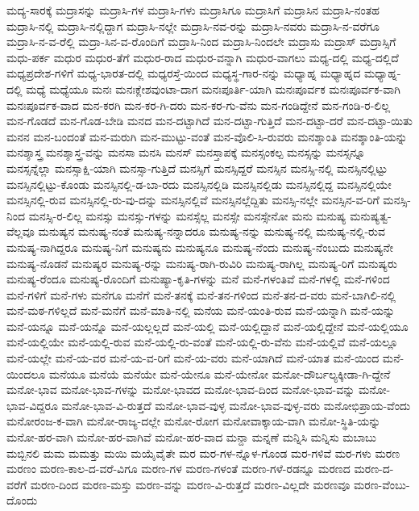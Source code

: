 {ಮದ್ಯ-ಸಾರಕ್ಕೆ
ಮದ್ರಾಸನ್ನು
ಮದ್ರಾಸಿ-ಗಳ
ಮದ್ರಾಸಿ-ಗಳು
ಮದ್ರಾಸಿಗೂ
ಮದ್ರಾಸಿಗೆ
ಮದ್ರಾಸಿನ
ಮದ್ರಾಸಿ-ನಂತಹ
ಮದ್ರಾಸಿ-ನಲ್ಲಿ
ಮದ್ರಾಸಿ-ನಲ್ಲಿದ್ದಾಗ
ಮದ್ರಾಸಿ-ನಲ್ಲೇ
ಮದ್ರಾಸಿ-ನವ-ರನ್ನು
ಮದ್ರಾಸಿ-ನವರು
ಮದ್ರಾಸಿ-ನ-ವರೆಗೂ
ಮದ್ರಾಸಿ-ನ-ವ-ರೆಲ್ಲಿ
ಮದ್ರಾ-ಸಿನ-ವ-ರೊಂದಿಗೆ
ಮದ್ರಾಸಿ-ನಿಂದ
ಮದ್ರಾಸಿ-ನಿಂದಲೇ
ಮದ್ರಾಸು
ಮದ್ರಾಸ್
ಮದ್ರಾಸ್ಸಿಗೆ
ಮಧು-ಪರ್ಕ
ಮಧುರ
ಮಧುರ-ತೆಗೆ
ಮಧುರ-ರಾದ
ಮಧುರ-ವನ್ನಾಗಿ
ಮಧುರ-ವಾಗಲು
ಮಧ್ಯ-ದಲ್ಲಿ
ಮಧ್ಯ-ದಲ್ಲಿದೆ
ಮಧ್ಯಪ್ರದೇಶ-ಗಳಿಗೆ
ಮಧ್ಯ-ಭಾರತ-ದಲ್ಲಿ
ಮಧ್ಯರಸ್ತೆ-ಯಿಂದ
ಮಧ್ಯಸ್ಥ-ಗಾರ-ನನ್ನು
ಮಧ್ಯಾಹ್ನ
ಮಧ್ಯಾಹ್ನದ
ಮಧ್ಯಾಹ್ನ-ದಲ್ಲಿ
ಮಧ್ಯೆ
ಮಧ್ಯೆಯೂ
ಮನಃ
ಮನಃಕ್ಲೇಶವುಂಟಾ-ದಾಗ
ಮನಃಪೂರ್ತಿ-ಯಾಗಿ
ಮನಃಪೂರ್ವಕ
ಮನಃಪೂರ್ವಕ-ವಾಗಿ
ಮನಃಪೂರ್ವಕ-ವಾದ
ಮನ-ಕರಗಿ
ಮನ-ಕರ-ಗಿ-ದರು
ಮನ-ಕರ-ಗು-ವೆನು
ಮನ-ಗಂಡಿದ್ದೇನೆ
ಮನ-ಗಂಡಿ-ರ-ಲಿಲ್ಲ
ಮನ-ಗೊಡದೆ
ಮನ-ಗೊಡ-ಬೇಡಿ
ಮನದ
ಮನ-ದಟ್ಟಾಗಿದೆ
ಮನ-ದಟ್ಟಾ-ಗುತ್ತಿದೆ
ಮನ-ದಟ್ಟಾ-ದರೆ
ಮನ-ದಟ್ಟಾ-ಯಿತು
ಮನನ
ಮನ-ಬಂದಂತೆ
ಮನ-ಮರುಗಿ
ಮನ-ಮುಟ್ಟು-ವಂತೆ
ಮನ-ವೊಲಿ-ಸಿ-ರುವರು
ಮನಶ್ಶಾಂತಿ
ಮನಶ್ಶಾಂತಿ-ಯನ್ನು
ಮನಶ್ಶಾಸ್ತ್ರ
ಮನಶ್ಶಾಸ್ತ್ರ-ವನ್ನು
ಮನಸಾ
ಮನಸಿ
ಮನಸ್
ಮನಸ್ತಾಪಕ್ಕೆ
ಮನಸ್ಸಂಕಲ್ಪ
ಮನಸ್ಸನ್ನು
ಮನಸ್ಸನ್ನೂ
ಮನಸ್ಸನ್ನೆಲ್ಲಾ
ಮನಸ್ಸಾಕ್ಷಿ-ಯಾಗಿ
ಮನಸ್ಸಾ-ಗುತ್ತಿದೆ
ಮನಸ್ಸಿಗೆ
ಮನಸ್ಸಿದ್ದರೆ
ಮನಸ್ಸಿನ
ಮನಸ್ಸಿ-ನಲ್ಲಿ
ಮನಸ್ಸಿನಲ್ಲಿಟ್ಟು
ಮನಸ್ಸಿನಲ್ಲಿಟ್ಟು-ಕೊಂಡು
ಮನಸ್ಸಿನಲ್ಲಿ-ಡ-ಬಾ-ರದು
ಮನಸ್ಸಿನಲ್ಲಿಡಿ
ಮನಸ್ಸಿನಲ್ಲಿಡು
ಮನಸ್ಸಿನಲ್ಲಿದ್ದ
ಮನಸ್ಸಿನಲ್ಲಿಯೇ
ಮನಸ್ಸಿನಲ್ಲಿ-ರುವ
ಮನಸ್ಸಿನಲ್ಲಿ-ರು-ವು-ದನ್ನು
ಮನಸ್ಸಿನಲ್ಲಿವೆ
ಮನಸ್ಸಿನಲ್ಲೆದ್ದಿತು
ಮನಸ್ಸಿ-ನಲ್ಲೇ
ಮನಸ್ಸಿನ-ವ-ರಿಗೆ
ಮನಸ್ಸಿ-ನಿಂದ
ಮನಸ್ಸಿ-ರ-ಲಿಲ್ಲ
ಮನಸ್ಸು
ಮನಸ್ಸು-ಗಳನ್ನು
ಮನಸ್ಸೆಲ್ಲ
ಮನಸ್ಸೇ
ಮನಸ್ಸೇನೋ
ಮನು
ಮನುಷ್ಯ
ಮನುಷ್ಯತ್ವ-ವೆಲ್ಲವೂ
ಮನುಷ್ಯನ
ಮನುಷ್ಯ-ನಂತೆ
ಮನುಷ್ಯ-ನನ್ನಾದರೂ
ಮನುಷ್ಯ-ನನ್ನು
ಮನುಷ್ಯ-ನಲ್ಲಿ
ಮನುಷ್ಯ-ನಲ್ಲಿ-ರುವ
ಮನುಷ್ಯ-ನಾಗಿದ್ದರೂ
ಮನುಷ್ಯ-ನಿಗೆ
ಮನುಷ್ಯನು
ಮನುಷ್ಯನೂ
ಮನುಷ್ಯ-ನೆಂದು
ಮನುಷ್ಯ-ನೆಂಬುದು
ಮನುಷ್ಯನೇ
ಮನುಷ್ಯ-ನೊಡನೆ
ಮನುಷ್ಯರ
ಮನುಷ್ಯ-ರನ್ನು
ಮನುಷ್ಯ-ರಾಗಿ-ರುವಿರಿ
ಮನುಷ್ಯ-ರಾಗಿಲ್ಲ
ಮನುಷ್ಯ-ರಿಗೆ
ಮನುಷ್ಯರು
ಮನುಷ್ಯ-ರೆಂದೂ
ಮನುಷ್ಯ-ರೊಂದಿಗೆ
ಮನುಷ್ಯಾ-ಕೃತಿ-ಗಳನ್ನು
ಮನೆ
ಮನೆ-ಗಳಂತಿವೆ
ಮನೆ-ಗಳಲ್ಲಿ
ಮನೆ-ಗಳಿಂದ
ಮನೆ-ಗಳಿಗೆ
ಮನೆ-ಗಳು
ಮನೆಗೂ
ಮನೆಗೆ
ಮನೆ-ತನಕ್ಕೆ
ಮನೆ-ತನ-ಗಳಿಂದ
ಮನೆ-ತನ-ದ-ವರು
ಮನೆ-ಬಾಗಿಲಿ-ನಲ್ಲಿ
ಮನೆ-ಮಠ-ಗಳಿಲ್ಲದೆ
ಮನೆ-ಮನೆಗೆ
ಮನೆ-ಮಾತಿ-ನಲ್ಲಿ
ಮನೆಯ
ಮನೆ-ಯಂತಿ-ರುವ
ಮನೆ-ಯನ್ನಾಗಿ
ಮನೆ-ಯನ್ನು
ಮನೆ-ಯನ್ನೂ
ಮನೆ-ಯನ್ನೊ
ಮನೆ-ಯಲ್ಲಲ್ಲದೆ
ಮನೆ-ಯಲ್ಲಿ
ಮನೆ-ಯಲ್ಲಿದ್ದಾನೆ
ಮನೆ-ಯಲ್ಲಿದ್ದೇನೆ
ಮನೆ-ಯಲ್ಲಿಯೂ
ಮನೆ-ಯಲ್ಲಿಯೇ
ಮನೆ-ಯಲ್ಲಿ-ರುವ
ಮನೆ-ಯಲ್ಲಿ-ರು-ವಂತೆ
ಮನೆ-ಯಲ್ಲಿ-ರು-ವೆನು
ಮನೆ-ಯಲ್ಲಿವೆ
ಮನೆ-ಯಲ್ಲೂ
ಮನೆ-ಯಲ್ಲೇ
ಮನೆ-ಯ-ವರ
ಮನೆ-ಯ-ವ-ರಿಗೆ
ಮನೆ-ಯ-ವರು
ಮನೆ-ಯಾಗಿದೆ
ಮನೆ-ಯಾತ
ಮನೆ-ಯಿಂದ
ಮನೆ-ಯಿಂದಲೂ
ಮನೆಯೂ
ಮನೆಯೆ
ಮನೆಯೇ
ಮನೆ-ಯೇನೂ
ಮನೆ-ಯೇನೋ
ಮನೋ-ದೌರ್ಬಲ್ಯಕ್ಕೀಡಾ-ಗಿ-ದ್ದೇನೆ
ಮನೋ-ಭಾವ
ಮನೋ-ಭಾವ-ಗಳನ್ನು
ಮನೋ-ಭಾವದ
ಮನೋ-ಭಾವ-ದಿಂದ
ಮನೋ-ಭಾವ-ವನ್ನು
ಮನೋ-ಭಾವ-ವಿದ್ದರೂ
ಮನೋ-ಭಾವ-ವಿ-ರುತ್ತದೆ
ಮನೋ-ಭಾವ-ವುಳ್ಳ
ಮನೋ-ಭಾವ-ವುಳ್ಳ-ವರು
ಮನೋಭಿಪ್ರಾಯ-ವೆಂದು
ಮನೋರಂಜ-ಕ-ವಾಗಿ
ಮನೋ-ರಾಜ್ಯ-ದಲ್ಲೇ
ಮನೋ-ರೋಗ
ಮನೋವಾಕ್ಕಾಯ-ವಾಗಿ
ಮನೋ-ಸ್ಥಿತಿ-ಯನ್ನು
ಮನೋ-ಹರ-ವಾಗಿ
ಮನೋ-ಹರ-ವಾಗಿವೆ
ಮನೋ-ಹರ-ವಾದ
ಮನ್ದಾ
ಮನ್ನಣೆ
ಮನ್ನಿಸಿ
ಮನ್ನಿಸು
ಮಬಾಬು
ಮಬ್ಬಿನಲಿ
ಮಮ
ಮಮತ್ತು
ಮಯಿ
ಮಯೈವೈತೇ
ಮರ
ಮರ-ಗಳ-ನ್ನೊಳ-ಗೊಂಡ
ಮರ-ಗಳಿವೆ
ಮರ-ಗಳು
ಮರಣ
ಮರಣಂ
ಮರಣ-ಕಾಲ-ದ-ವರೆ-ವಿಗೂ
ಮರಣ-ಗಳ
ಮರಣ-ಗಳಂತೆ
ಮರಣ-ಗಳೆ-ರಡನ್ನೂ
ಮರಣದ
ಮರಣ-ದ-ವರೆಗೆ
ಮರಣ-ದಿಂದ
ಮರಣ-ಮಸ್ತು
ಮರಣ-ವನ್ನು
ಮರಣ-ವಿ-ರುತ್ತದೆ
ಮರಣ-ವಿಲ್ಲದೇ
ಮರಣವೂ
ಮರಣ-ವೆಂಬು-ದೊಂದು
}
